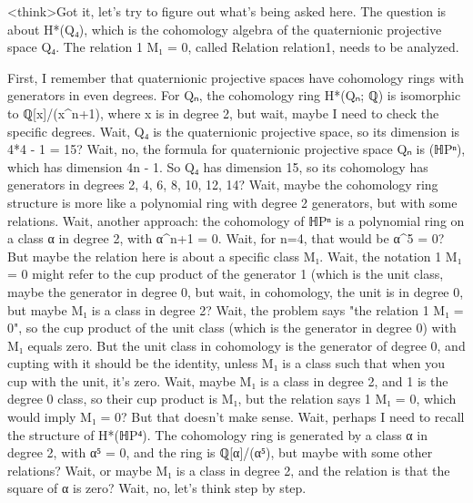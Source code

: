 <think>Got it, let's try to figure out what's being asked here. The question is about H*(Q₄), which is the cohomology algebra of the quaternionic projective space Q₄. The relation {1} M₁ = 0, called Relation relation1, needs to be analyzed. 

First, I remember that quaternionic projective spaces have cohomology rings with generators in even degrees. For Qₙ, the cohomology ring H*(Qₙ; ℚ) is isomorphic to ℚ[x]/(x^{n+1}), where x is in degree 2, but wait, maybe I need to check the specific degrees. Wait, Q₄ is the quaternionic projective space, so its dimension is 4*4 - 1 = 15? Wait, no, the formula for quaternionic projective space Qₙ is (ℍPⁿ), which has dimension 4n - 1. So Q₄ has dimension 15, so its cohomology has generators in degrees 2, 4, 6, 8, 10, 12, 14? Wait, maybe the cohomology ring structure is more like a polynomial ring with degree 2 generators, but with some relations. Wait, another approach: the cohomology of ℍPⁿ is a polynomial ring on a class α in degree 2, with α^{n+1} = 0. Wait, for n=4, that would be α^5 = 0? But maybe the relation here is about a specific class M₁. Wait, the notation {1} M₁ = 0 might refer to the cup product of the generator {1} (which is the unit class, maybe the generator in degree 0, but wait, in cohomology, the unit is in degree 0, but maybe M₁ is a class in degree 2? Wait, the problem says "the relation {1} M₁ = 0", so the cup product of the unit class (which is the generator in degree 0) with M₁ equals zero. But the unit class in cohomology is the generator of degree 0, and cupting with it should be the identity, unless M₁ is a class such that when you cup with the unit, it's zero. Wait, maybe M₁ is a class in degree 2, and {1} is the degree 0 class, so their cup product is M₁, but the relation says {1} M₁ = 0, which would imply M₁ = 0? But that doesn't make sense. Wait, perhaps I need to recall the structure of H*(ℍP⁴). The cohomology ring is generated by a class α in degree 2, with α⁵ = 0, and the ring is ℚ[α]/(α⁵), but maybe with some other relations? Wait, or maybe M₁ is a class in degree 2, and the relation is that the square of α is zero? Wait, no, let's think step by step.

